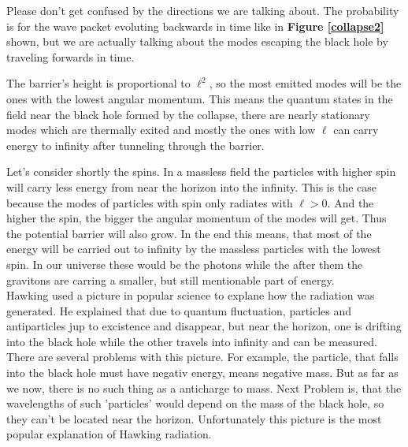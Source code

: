 	Please don't get confused by the directions we are talking about. The probability is for the wave packet evoluting backwards in time like in \textbf{Figure \ref{collapse2}} shown, but we are actually talking about the modes escaping the black hole by traveling forwards in time.
	 
	The barrier's height is proportional to $\ell^2$, so the most emitted modes will be the ones with the lowest angular momentum. This means the quantum states in the field near the black hole formed by the collapse, there are nearly stationary modes which are thermally exited and mostly the ones with low $\ell$ can carry energy to infinity after tunneling through the barrier. 
	
	Let's consider shortly the spins. In a massless field the particles with higher spin will carry less energy from near the horizon into the infinity. This is the case because the modes of particles with spin only radiates with $\ell >0$. And the higher the spin, the bigger the angular momentum of the modes will get. Thus the potential barrier will also grow. In the end this means, that most of the energy will be carried out to infinity by the massless particles with the lowest spin. In our universe these would be the photons while the after them the gravitons are carring a smaller, but still mentionable part of energy.\\
	
	Hawking used a picture in popular science to explane how the radiation was generated. He explained that due to quantum fluctuation, particles and antiparticles jup to excistence and disappear, but near the horizon, one is drifting into the black hole while the other travels into infinity and can be measured. There are several problems with this picture. For example, the particle, that falls into the black hole must have negativ energy, means negative mass. But as far as we now, there is no such thing as a anticharge to mass. Next Problem is, that the wavelengths of such 'particles' would depend on the mass of the black hole, so they can't be located near the horizon. Unfortunately this picture is the most popular explanation of Hawking radiation.
	